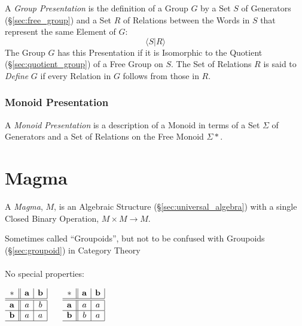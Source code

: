 A \emph{Group Presentation} is the definition of a Group $G$ by a Set
$S$ of Generators (\S\ref{sec:free_group}) and a Set $R$ of Relations
between the Words in $S$ that represent the same Element of $G$:
\[
  \langle S | R \rangle
\]
The Group $G$ has this Presentation if it is Isomorphic to the
Quotient (\S\ref{sec:quotient_group}) of a Free Group on $S$. The Set
of Relations $R$ is said to \emph{Define} $G$ if every Relation in $G$
follows from those in $R$.



\subsubsection{Monoid Presentation}\label{sec:monoid_presentation}

A \emph{Monoid Presentation} is a description of a Monoid in terms of
a Set $\Sigma$ of Generators and a Set of Relations on the Free Monoid
$\Sigma*$.



\section{Magma}\label{sec:magma}

A \emph{Magma}, $M$, is an Algebraic Structure
(\S\ref{sec:universal_algebra}) with a single Closed Binary Operation,
$M \times M \rightarrow M$.

\fist Sometimes called ``Groupoids'', but not to be confused with Groupoids
(\S\ref{sec:groupoid}) in Category Theory
\\ \\
No special properties:

$\begin{array}{c||c|c|}
  * & \mathbf{a} & \mathbf{b} \\ \hline \hline
  \mathbf{a} & a & b \\ \hline
  \mathbf{b} & a & a \\ \hline
\end{array}$ $\quad$ $\begin{array}{c||c|c|}
  * & \mathbf{a} & \mathbf{b} \\ \hline \hline
  \mathbf{a} & a & a \\ \hline
  \mathbf{b} & b & a \\ \hline
\end{array}$ \\ \hfill \\


